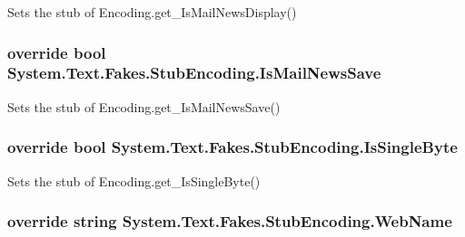 Sets the stub of Encoding.\-get\-\_\-\-Is\-Mail\-News\-Display()

\hypertarget{class_system_1_1_text_1_1_fakes_1_1_stub_encoding_accb4e359b9ed466bb199413dc0393934}{
\subsubsection[{Is\-Mail\-News\-Save}]{\setlength{\rightskip}{0pt plus 5cm}override bool System.\-Text.\-Fakes.\-Stub\-Encoding.\-Is\-Mail\-News\-Save\hspace{0.3cm}{\ttfamily [get]}}}\label{class_system_1_1_text_1_1_fakes_1_1_stub_encoding_accb4e359b9ed466bb199413dc0393934}


Sets the stub of Encoding.\-get\-\_\-\-Is\-Mail\-News\-Save()

\hypertarget{class_system_1_1_text_1_1_fakes_1_1_stub_encoding_adee6cc70909c3c18fd26ea3bbe9387b1}{
\subsubsection[{Is\-Single\-Byte}]{\setlength{\rightskip}{0pt plus 5cm}override bool System.\-Text.\-Fakes.\-Stub\-Encoding.\-Is\-Single\-Byte\hspace{0.3cm}{\ttfamily [get]}}}\label{class_system_1_1_text_1_1_fakes_1_1_stub_encoding_adee6cc70909c3c18fd26ea3bbe9387b1}


Sets the stub of Encoding.\-get\-\_\-\-Is\-Single\-Byte()

\hypertarget{class_system_1_1_text_1_1_fakes_1_1_stub_encoding_af3773749cb2996fdf4b648b1b5650fb5}{
\subsubsection[{Web\-Name}]{\setlength{\rightskip}{0pt plus 5cm}override string System.\-Text.\-Fakes.\-Stub\-Encoding.\-Web\-Name\hspace{0.3cm}{\ttfamily [get]}}}\label{class_system_1_1_text_1_1_fakes_1_1_stub_encoding_af3773749cb2996fdf4b648b1b5650fb5}


